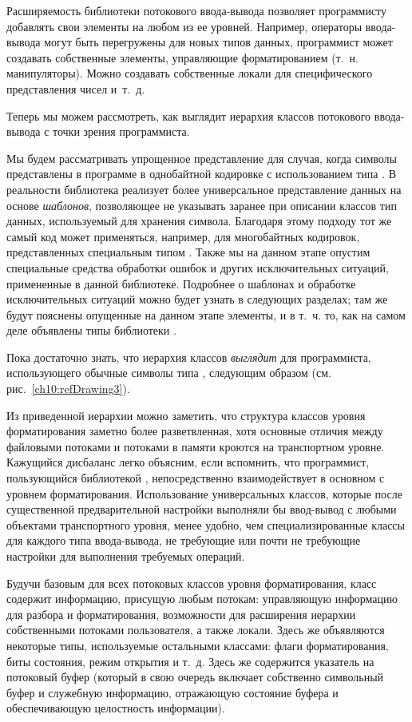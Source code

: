Расширяемость библиотеки потокового ввода-вывода позволяет программисту добавлять свои элементы на любом из ее уровней.
Например, операторы ввода-вывода могут быть перегружены для новых типов данных, программист может создавать собственные
элементы, управляющие форматированием (т.~н. манипуляторы). Можно создавать собственные локали для специфического
представления чисел и~т.~д. 

Теперь мы можем рассмотреть, как выглядит иерархия классов потокового ввода-вывода с точки зрения программиста. 

Мы будем рассматривать упрощенное представление для случая, когда символы представлены в программе в однобайтной
кодировке с использованием типа . В реальности библиотека 
реализует более универсальное представление данных на основе \emph{шаблонов}, позволяющее не
указывать заранее при описании классов тип данных, используемый для хранения символа. Благодаря этому подходу тот же
самый код может применяться, например, для многобайтных кодировок, представленных специальным типом
. Также мы на данном этапе опустим специальные средства обработки ошибок и других
исключительных ситуаций, примененные в данной библиотеке. Подробнее о шаблонах и обработке исключительных ситуаций
можно будет узнать в следующих разделах; там же будут пояснены опущенные на данном этапе элементы, и в т.~ч. то, как на
самом деле объявлены типы библиотеки . 

Пока достаточно знать, что иерархия классов  \emph{выглядит}
 для программиста, использующего обычные символы типа , следующим образом (см. рис.~\ref{ch10:refDrawing3}).

Из приведенной иерархии можно заметить, что структура классов уровня форматирования заметно более разветвленная, хотя
основные отличия между файловыми потоками и потоками в памяти кроются на транспортном уровне. Кажущийся дисбаланс легко
объясним, если вспомнить, что программист, пользующийся библиотекой , непосредственно
взаимодействует в основном с уровнем форматирования. Использование универсальных классов, которые после существенной
предварительной настройки выполняли бы ввод-вывод с любыми объектами транспортного уровня, менее удобно, чем
специализированные классы для каждого типа ввода-вывода, не требующие или почти не требующие настройки для выполнения
требуемых операций.

Будучи базовым для всех потоковых классов уровня форматирования, класс  содержит информацию,
присущую любым потокам: управляющую информацию для разбора и форматирования, возможности для расширения иерархии
собственными потоками пользователя, а также локали. Здесь же объявляются некоторые типы, используемые остальными
классами: флаги форматирования, биты состояния, режим открытия и т.~д. Здесь же содержится указатель на потоковый буфер
(который в свою очередь включает собственно символьный буфер и служебную информацию, отражающую состояние буфера и
обеспечивающую целостность информации).


